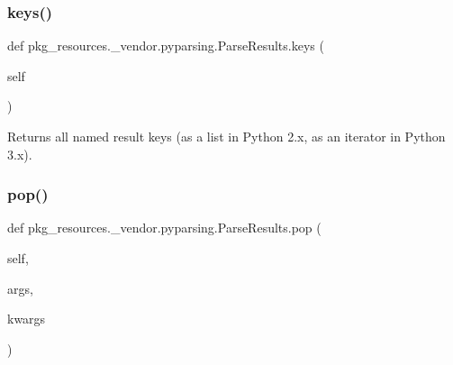 \subsubsection{\texorpdfstring{keys()}{keys()}}
{\footnotesize\ttfamily def pkg\+\_\+resources.\+\_\+vendor.\+pyparsing.\+Parse\+Results.\+keys (\begin{DoxyParamCaption}\item[{}]{self }\end{DoxyParamCaption})}

\begin{DoxyVerb}Returns all named result keys (as a list in Python 2.x, as an iterator in Python 3.x).\end{DoxyVerb}
 \mbox{\label{classpkg__resources_1_1__vendor_1_1pyparsing_1_1ParseResults_acc6fbc0292ad831becc3c9506d88099f}} 
\subsubsection{\texorpdfstring{pop()}{pop()}}
{\footnotesize\ttfamily def pkg\+\_\+resources.\+\_\+vendor.\+pyparsing.\+Parse\+Results.\+pop (\begin{DoxyParamCaption}\item[{}]{self,  }\item[{}]{args,  }\item[{}]{kwargs }\end{DoxyParamCaption})}


